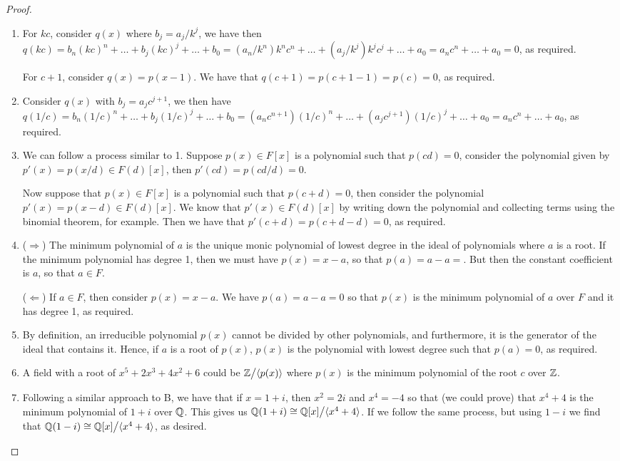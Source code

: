 \begin{proof}
 \begin{enumerate}
     \item For $kc$, consider $q(x)$ where $b_j=a_j/k^j$, we have then $q(kc)= b_n(kc)^n+\dots+b_j(kc)^j+\dots+b_0= (a_n/k^n)k^nc^n+\dots+(a_j/k^j)k^jc^j+\dots+a_0= a_nc^n+\dots+a_0= 0$, as required.
     
     For $c+1$, consider $q(x)=p(x-1)$. We have that $q(c+1)=p(c+1-1)=p(c)=0$, as required.
     \item Consider $q(x)$ with $b_j=a_jc^{j+1}$, we then have $q(1/c)= b_n(1/c)^n+\dots+b_j(1/c)^j+\dots+b_0= (a_nc^{n+1})(1/c)^n+\dots+(a_jc^{j+1})(1/c)^j+\dots+a_0= a_nc^n+\dots+a_0$, as required.
     \item We can follow a process similar to 1. Suppose $p(x)\in F[x]$ is a polynomial such that $p(cd)=0$, consider the polynomial given by $p'(x)=p(x/d)\in F(d)[x]$, then $p'(cd)=p(cd/d)=0$. 
     
     Now suppose that $p(x)\in F[x]$ is a polynomial such that $p(c+d)=0$, then consider the polynomial $p'(x)=p(x-d)\in F(d)[x]$. We know that $p'(x)\in F(d)[x]$ by writing down the polynomial and collecting terms using the binomial theorem, for example. Then we have that $p'(c+d)=p(c+d-d)=0$, as required.
    \item ($\Rightarrow$) The minimum polynomial of $a$ is the unique monic polynomial of lowest degree in the ideal of polynomials where $a$ is a root. If the minimum polynomial has degree 1, then we must have $p(x)=x-a$, so that $p(a)=a-a=$. But then the constant coefficient is $a$, so that $a\in F$.

    ($\Leftarrow$) If $a\in F$, then consider $p(x)=x-a$. We have $p(a)=a-a=0$ so that $p(x)$ is the minimum polynomial of $a$ over $F$ and it has degree 1, as required.
    \item By definition, an irreducible polynomial $p(x)$ cannot be divided by other polynomials, and furthermore, it is the generator of the ideal that contains it. Hence, if $a$ is a root of $p(x)$, $p(x)$ is the polynomial with lowest degree such that $p(a)=0$, as required.
    \item A field with a root of $x^5+2x^3+4x^2+6$ could be ${\textstyle \mathbb{Z}}\big/{\textstyle \langle p(x)\rangle}$ where $p(x)$ is the minimum polynomial of the root $c$ over $\mathbb{Z}$.
    \item Following a similar approach to B, we have that if $x=1+i$, then $x^2=2i$ and $x^4=-4$ so that (we could prove) that $x^4+4$ is the minimum polynomial of $1+i$ over $\mathbb{Q}$. This gives us $\mathbb{Q}(1+i)\cong{\textstyle \mathbb{Q}[x]}\big/{\textstyle \langle x^4+4\rangle}$. If we follow the same process, but using $1-i$ we find that $\mathbb{Q}(1-i)\cong{\textstyle \mathbb{Q}[x]}\big/{\textstyle \langle x^4+4\rangle}$, as desired.


\end{enumerate}
\end{proof}
